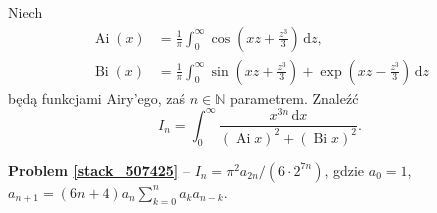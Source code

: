 %

\begin{problem_with_solution}[pytanie 507425]
    \label{stack_507425}%
    Niech
    \begin{align}
        \operatorname{Ai} (x) & = \frac 1 \pi \int_0^\infty \cos \left( x z + \frac {z^3} 3 \right) \,\mathrm{d}z, \\
        \operatorname{Bi} (x) & = \frac 1 \pi \int_0^\infty \sin \left( x z + \frac {z^3} 3 \right) + \exp \left( x z - \frac {z^3} 3 \right) \,\mathrm{d}z
    \end{align}
    będą funkcjami Airy'ego, zaś $n \in \mathbb N$ parametrem.
    Znaleźć
    \begin{equation}
        I_n = \int_0^\infty \frac{x^{3n} \,\mathrm{d} x}{(\operatorname{Ai} x)^2 + (\operatorname{Bi} x)^2}.
    \end{equation}
\end{problem_with_solution}

\textbf{Problem \ref{stack_507425}} -- $I_n = \pi^2 a_{2n} / (6 \cdot 2^{7n})$, gdzie $a_0 = 1$, $a_{n+1} = (6n+4)a_n \sum_{k=0}^n a_k a_{n-k}$.


%